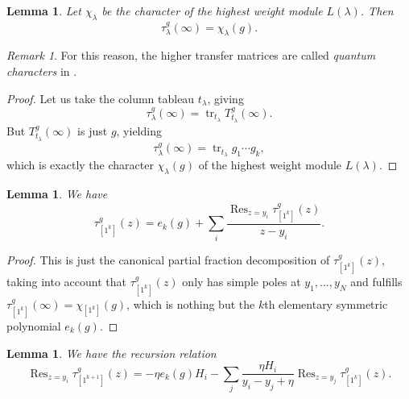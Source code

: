 \documentclass[11pt]{report}
\newtheorem{lemma}[theorem]{Lemma}
\theoremstyle{definition}
\theoremstyle{remark}
\newtheorem*{remark}{Remark}
\theoremstyle{remark}
\begin{document}
\begin{lemma}\label{lemma:transferMatrixExpansion}
Let $\chi_\lambda$ be the character of the highest weight module $L(\lambda)$. Then
\begin{equation*}
\tau_\lambda^g(\infty) = \chi_\lambda(g).
\end{equation*}
\end{lemma}

\begin{remark}
For this reason, the higher transfer matrices are called \emph{quantum characters} in \cite{book:arutyunov:betheAnsatz}.
\end{remark}

\begin{proof}
Let us take the column tableau $t_\lambda$, giving
\begin{equation*}
\tau_\lambda^g(\infty) = \operatorname{tr}_{t_\lambda} T_{t_\lambda}^g(\infty).
\end{equation*}
But $T_{t_\lambda}^g(\infty)$ is just $g$, yielding
\begin{equation*}
\tau_\lambda^g(\infty) = \operatorname{tr}_{t_\lambda} g_1 \cdots g_k,
\end{equation*}
which is exactly the character $\chi_\lambda(g)$ of the highest weight module $L(\lambda)$.
\end{proof}

\begin{lemma}
We have
\begin{equation*}
\tau_{[1^k]}^g(z) = e_k(g) + \sum_i \frac{\operatorname{Res}_{z=y_i} \tau_{[1^k]}^g(z)}{z-y_i}.
\end{equation*}
\end{lemma}

\begin{proof}
This is just the canonical partial fraction decomposition of $\tau_{[1^k]}^g(z)$, taking into account that $\tau_{[1^k]}^g(z)$ only has simple poles at $y_1,...,y_N$ and fulfills $\tau_{[1^k]}^g(\infty) = \chi_{[1^k]}(g)$, which is nothing but the $k$th elementary symmetric polynomial $e_k(g)$.
\end{proof}

\begin{lemma}\label{lemma:recursionRelation}
We have the recursion relation
\begin{equation*}
\operatorname{Res}_{z=y_i} \tau_{[1^{k+1}]}^g(z)
= -\eta e_k(g) H_i - \sum_j \frac{\eta H_i}{y_i-y_j+\eta} \operatorname{Res}_{z=y_j} \tau_{[1^k]}^g(z).
\end{equation*}
\end{lemma}
\end{document}
